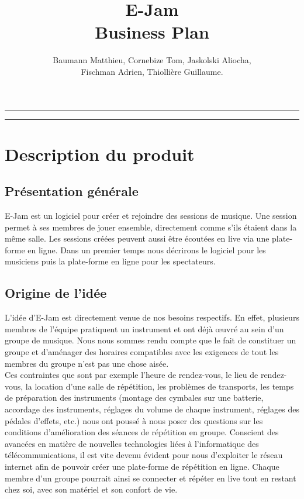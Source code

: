 \documentclass[a4,12pt]{article}
\begin{document}
\begin{titlepage}
\title{ E-Jam \\ Business Plan}
\author{Baumann Matthieu, Cornebize Tom, Jaskolski Aliocha, \\Fischman Adrien, Thiollière Guillaume.}
\end{titlepage}
\date{}

\maketitle

\rule[0.5ex]{\textwidth}{0.2mm}


\rule[0.5ex]{\textwidth}{0.2mm}

\newpage
\tableofcontents
\newpage

\section{Description du produit}


\subsection{Présentation générale}
E-Jam est un logiciel pour créer et rejoindre des sessions de musique. Une session permet à ses membres de jouer ensemble, directement comme s’ils étaient dans la même salle. Les sessions créées peuvent aussi être écoutées en live via une plate-forme en ligne. Dans un premier temps nous décrirons le logiciel pour les musiciens puis la plate-forme en ligne pour les spectateurs.


\subsection{Origine de l'idée}
L'idée d'E-Jam est directement venue de nos besoins respectifs. En effet, plusieurs
membres de l'équipe pratiquent un instrument et ont déjà œuvré au sein
d'un groupe de musique. Nous nous sommes rendu compte que le fait de constituer un
groupe et d'aménager des horaires compatibles avec les exigences de tout les membres du
groupe n'est pas une chose aisée.\\

Ces contraintes que sont par exemple l'heure de rendez-vous, le lieu de rendez-vous, la
location d'une salle de répétition, les problèmes de transports, les temps de préparation des
instruments (montage des cymbales sur une batterie, accordage des instruments, réglages du
volume de chaque instrument, réglages des pédales d'effets, etc.) nous ont poussé à nous poser
des questions sur les conditions d'amélioration des séances de répétition en groupe.
Conscient des avancées en matière de nouvelles technologies liées à l'informatique des
télécommunications, il est vite devenu évident pour nous d'exploiter le réseau internet afin
de pouvoir créer une plate-forme de répétition en ligne. Chaque membre d'un groupe
pourrait ainsi se connecter et répéter en live tout en restant chez soi, avec son matériel
et son confort de vie.
\end{document}
